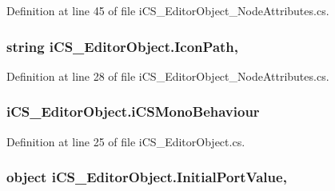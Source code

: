 Definition at line 45 of file i\+C\+S\+\_\+\+Editor\+Object\+\_\+\+Node\+Attributes.\+cs.

\hypertarget{classi_c_s___editor_object_a9c93781b73b437d64b59e8e926437604}{
\subsubsection[{Icon\+Path}]{\setlength{\rightskip}{0pt plus 5cm}string i\+C\+S\+\_\+\+Editor\+Object.\+Icon\+Path\hspace{0.3cm}{\ttfamily [get]}, {\ttfamily [set]}}}\label{classi_c_s___editor_object_a9c93781b73b437d64b59e8e926437604}


Definition at line 28 of file i\+C\+S\+\_\+\+Editor\+Object\+\_\+\+Node\+Attributes.\+cs.

\hypertarget{classi_c_s___editor_object_aaba233ad25c3953146983f967a9549c4}{
\subsubsection[{i\+C\+S\+Mono\+Behaviour}]{ i\+C\+S\+\_\+\+Editor\+Object.\+i\+C\+S\+Mono\+Behaviour\hspace{0.3cm}{\ttfamily [get]}}}\label{classi_c_s___editor_object_aaba233ad25c3953146983f967a9549c4}


Definition at line 25 of file i\+C\+S\+\_\+\+Editor\+Object.\+cs.

\hypertarget{classi_c_s___editor_object_a09688615d6517ef1953a2b9ef6d4c23c}{
\subsubsection[{Initial\+Port\+Value}]{\setlength{\rightskip}{0pt plus 5cm}object i\+C\+S\+\_\+\+Editor\+Object.\+Initial\+Port\+Value\hspace{0.3cm}{\ttfamily [get]}, {\ttfamily [set]}}}\label{classi_c_s___editor_object_a09688615d6517ef1953a2b9ef6d4c23c}


